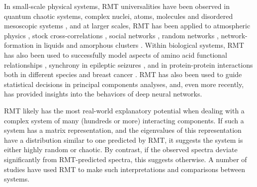 \documentclass[12pt]{spieman}  %
\begin{document}
\begin{spacing}{2}
In small-scale physical systems, RMT universalities have been observed in
quantum chaotic systems, complex nuclei, atoms, molecules and disordered
mesoscopic systems
\cite{guhrRandommatrixTheoriesQuantum1998a,mehtaRandomMatrices2004,brodyRandommatrixPhysicsSpectrum1981,beenakkerRandommatrixTheoryQuantum1997,bohigasHigherOrderCorrelationsSpectra1985,wintgenLevelStatisticsQuantized1988,pandeySkewOrthogonalPolynomialsUniversality2001},
and at larger scales, RMT has been applied to atmospheric physics
\cite{santhanamStatisticsAtmosphericCorrelations2001}, stock cross-correlations
\cite{plerouRandomMatrixApproach2002} , social networks
\cite{jalanUncoveringRandomnessSuccess2014}, random networks
\cite{bandyopadhyayUniversalityComplexNetworks2007}, network-formation in
liquids
\cite{sastrySpectralStatisticsInstantaneous2001,matharooSpectralStatisticsQuenched2009}
and amorphous clusters
\cite{sarkarUniversalityVibrationalSpectra2004,matharooVibrationalSpectraAmorphous2005,matharooUniversalityVibrationalSpectra2008}.
Within biological systems, RMT has also been used to successfully model aspects
of  amino acid functional relationships
\cite{bhadolaTargetingFunctionalMotifs2016}, synchrony in epileptic seizures
\cite{osorioPhasesynchronizationRandommatrixBased2011}, and in protein-protein
interactions both in different species
\cite{agrawalQuantifyingRandomnessProtein2014} and breast cancer
\cite{raiRandomnessPreservedPatterns2015}. RMT has also been used to guide
statistical decisions in principal components
analyses\cite{franklinParallelAnalysisMethod1995,
veraartDenoisingDiffusionMRI2016, ulfarssonDimensionEstimationNoisy2008}, and,
even more recently, has provided insights into the behaviors of deep
neural networks\cite{martinImplicitSelfRegularizationDeep2021,
martinPredictingTrendsQuality2021}.

RMT likely has the most real-world explanatory potential when dealing with a
complex system of many (hundreds or more\cite{mehtaRandomMatrices2004})
interacting components. If such a system has a matrix representation, and the
eigenvalues of this representation have a distribution similar to one predicted
by RMT, it suggests the system is either highly random or chaotic. By contrast,
if the observed spectra deviate significantly from RMT-predicted spectra, this
suggests otherwise. A number of studies have used RMT to make such
interpretations and comparisons between
systems\cite{santhanamStatisticsAtmosphericCorrelations2001,
jalanUncoveringRandomnessSuccess2014,
bandyopadhyayUniversalityComplexNetworks2007,
agrawalQuantifyingRandomnessProtein2014, raiRandomnessPreservedPatterns2015,
sebaRandomMatrixAnalysis2003, wangSpectralPropertiesTemporal2015,
wangRandomMatrixTheory2016, matharooSpontaneousBackpainAlters2020}.


\end{spacing}
\end{document}
